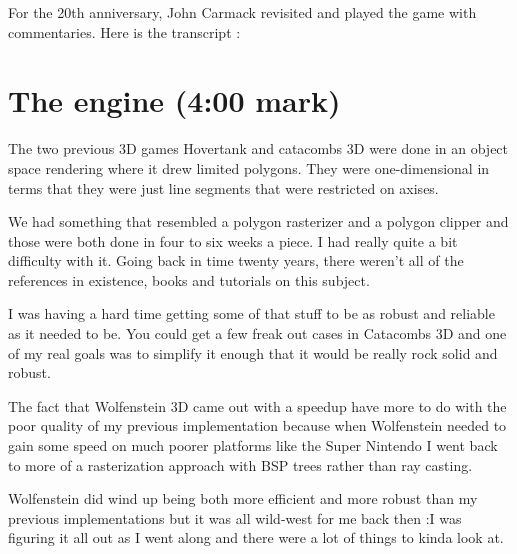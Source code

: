 \documentclass[book.tex]{subfiles}
\begin{document}
For the 20th anniversary, John Carmack revisited and played the game with commentaries. Here is the transcript :


   
\section{The engine (4:00 mark)}

The two previous 3D games Hovertank and catacombs 3D were done in an object space rendering where it drew limited polygons. They were one-dimensional in terms that they were just line segments that were restricted on axises.\\
\par
We had something that resembled a polygon rasterizer and a polygon clipper and those were both done in four to six weeks a piece. I had really quite a bit difficulty with it. Going back in time twenty years, there weren't all of the references in existence, books and tutorials on this subject.\\
\par
I was having a hard time getting some of that stuff to be as robust
and reliable as it needed to be. You could get a few freak out cases
in Catacombs 3D and one of my real goals was to simplify it enough
that it would be really rock solid and robust.\\
\par

The fact that Wolfenstein 3D came out with a speedup have more to do with the poor quality of my previous implementation because when Wolfenstein  needed to gain some speed on much poorer platforms like the Super Nintendo I went back to more of a rasterization approach with BSP trees rather than ray casting.\\
\par

Wolfenstein did wind up being both more efficient and more robust than my previous implementations but it was all wild-west for me back then :I was figuring it  all out as I went along and there were a lot of things to kinda look at.\\
\par
\end{document}
